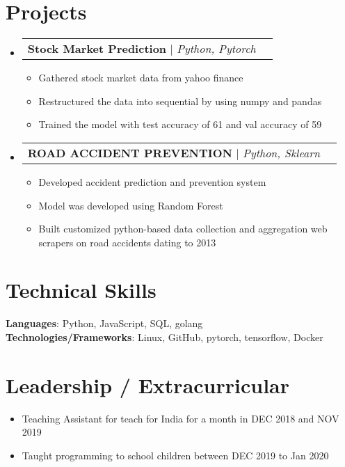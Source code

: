 \documentclass[letterpaper,11pt]{article}
\makeatletter
\newcommand{\resumeItem}[1]{
  \item\small{
    {#1 \vspace{-2pt}}
  }
}
\newcommand{\resumeProjectHeading}[2]{
    \item
    \begin{tabular*}{1.001\textwidth}{l@{\extracolsep{\fill}}r}
      \small#1 & \textbf{\small #2}\\
    \end{tabular*}\vspace{-7pt}
}
\newcommand{\resumeSubHeadingListStart}{\begin{itemize}[leftmargin=0.0in, label={}]}
\newcommand{\resumeSubHeadingListEnd}{\end{itemize}}
\newcommand{\resumeItemListStart}{\begin{itemize}}
\newcommand{\resumeItemListEnd}{\end{itemize}\vspace{-5pt}}
\makeatother
\begin{document}
\section{Projects}
    \resumeSubHeadingListStart
      \resumeProjectHeading
          {\textbf{Stock Market Prediction} $|$ \emph{Python, Pytorch}}{}
          \resumeItemListStart
            \resumeItem{Gathered stock market data from yahoo finance}
            \resumeItem{Restructured the data into sequential by using numpy and pandas}
            \resumeItem{Trained the model with test accuracy of 61 and val accuracy of 59}
          \resumeItemListEnd
          \vspace{-13pt}
      \resumeProjectHeading
          {\textbf{ROAD ACCIDENT PREVENTION} $|$ \emph{Python, Sklearn}}{}
          \resumeItemListStart
            \resumeItem{Developed accident prediction and prevention system}
            \resumeItem{Model was developed using Random Forest}
            \resumeItem{Built customized python-based data collection and aggregation web scrapers on road accidents dating to 2013}
          \resumeItemListEnd 
    \resumeSubHeadingListEnd
\vspace{-15pt}


%
\section{Technical Skills}
 \begin{itemize}[leftmargin=0.15in, label={}]
    \small{\item{
     \textbf{Languages}{: Python, JavaScript, SQL, golang} \\
     \textbf{Technologies/Frameworks}{: Linux, GitHub, pytorch, tensorflow, Docker} \\
    }}
 \end{itemize}
 \vspace{-16pt}


\section{Leadership / Extracurricular}
            \resumeItemListStart
                \resumeItem{Teaching Assistant for teach for India for a month in DEC 2018 and NOV 2019}
                \resumeItem{Taught programming to school children between DEC 2019 to Jan 2020}
            \resumeItemListEnd
\end{document}
